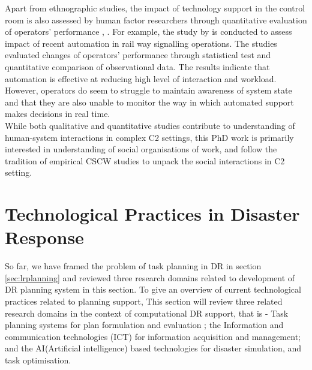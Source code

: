 Apart from ethnographic studies, the impact of technology support in the control room is also assessed by human factor researchers through quantitative evaluation of operators' performance \cite{Grootjen2007}, \cite{Sharples2011}. For example, the study by \cite{Sharples2011} is conducted to assess impact of recent automation in rail way signalling operations. The studies evaluated changes of operators' performance through statistical test and quantitative comparison of observational data. The results indicate that automation is effective at reducing high level of interaction and workload. However, operators do seem to struggle to maintain awareness of system state and that they are also unable to monitor the way in which automated support makes decisions in real time. \\

While both qualitative and quantitative studies contribute to understanding of human-system interactions in complex C2 settings, this PhD work is primarily interested in understanding of social organisations of work, and follow the tradition of empirical CSCW studies to unpack the social interactions in C2 setting. \\



\section{Technological Practices in Disaster Response} \label{sec:LRApplicationAreas}
So far, we have framed the problem of task planning in DR in section \ref{sec:lrplanning} and reviewed three research domains related to development of DR planning system in this section. To give an overview of current technological practices related to planning support, This section will review three related research domains in the context of computational DR support, that is - Task planning systems for plan formulation and evaluation ; the Information and communication technologies (ICT) for information acquisition and management; and the AI(Artificial intelligence) based technologies for disaster simulation, and task optimisation.  \\

